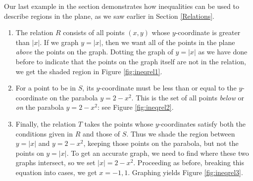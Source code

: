 \medskip

Our last example in the section demonstrates how inequalities can be used to describe regions in the plane, as we saw earlier in Section \ref{Relations}.

\medskip

{
\begin{enumerate}

\item  The relation $R$ consists of all points $(x,y)$ whose $y$-coordinate is greater than $|x|$.  If we graph $y=|x|$, then we want all of the points in the plane \emph{above} the points on the graph.  Dotting the graph of $y=|x|$ as we have done before to indicate that the points on the graph itself are not in the relation, we get the shaded region in Figure \ref{fig:ineqrel1}.



\item  For a point to be in $S$, its $y$-coordinate must be less than or equal to the $y$-coordinate on the parabola $y=2-x^2$.  This is the set of all points \emph{below} or \emph{on} the parabola $y=2-x^2$: see Figure \ref{fig:ineqrel2}.



\item  Finally, the relation $T$ takes the points whose $y$-coordinates satisfy both the conditions given in $R$ and those of $S$.  Thus we shade the region between $y=|x|$ and $y=2-x^2$, keeping those points on the parabola, but not the points on $y=|x|$.  To get an accurate graph, we need to find where these two graphs intersect, so we set $|x| = 2-x^2$.  Proceeding as before, breaking this equation into cases, we get $x=-1,1$.  Graphing yields Figure \ref{fig:ineqrel3}.

\end{enumerate}
}

